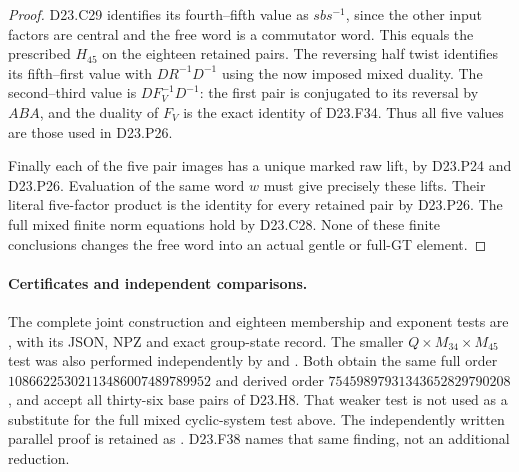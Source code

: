\begin{proof}
D23.C29 identifies its fourth--fifth value as
$sbs^{-1}$, since the other input factors are central
and the free word is a commutator word. This equals
the prescribed $H_{45}$ on the eighteen retained
pairs. The reversing half twist identifies its
fifth--first value with $DR^{-1}D^{-1}$ using the
now imposed mixed duality. The second--third value
is $DF_V^{-1}D^{-1}$: the first pair is conjugated
to its reversal by $ABA$, and the duality of $F_V$
is the exact identity of D23.F34. Thus all five
values are those used in D23.P26.

Finally each of the five pair images has a unique
marked raw lift, by D23.P24 and D23.P26. Evaluation
of the same word $w$ must give precisely these lifts.
Their literal five-factor product is the identity
for every retained pair by D23.P26. The full mixed
finite norm equations hold by D23.C28. None of these
finite conclusions changes the free word into an
actual gentle or full-GT element.
\end{proof}

\paragraph{Certificates and independent comparisons.}
The complete joint construction and eighteen membership
and exponent tests are
,
with its JSON, NPZ and exact group-state record.
The smaller $Q\times M_{34}\times M_{45}$ test was
also performed independently by
and .
Both obtain the same full order
$10866225302113486007489789952$ and derived order
$75459897931343652829790208$, and accept all thirty-six
base pairs of D23.H8. That weaker test is not used as
a substitute for the full mixed cyclic-system test above.
The independently written parallel proof is retained as
.
D23.F38 names that same finding, not an additional reduction.
